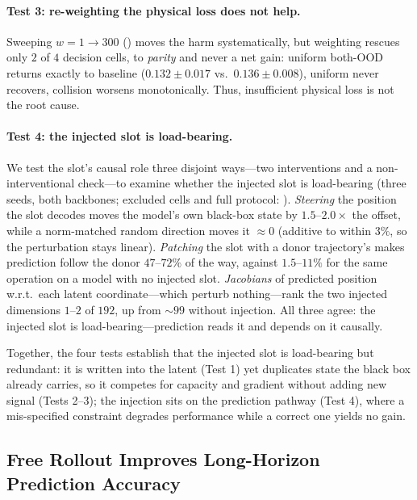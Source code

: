 \paragraph{Test 3: re-weighting the physical loss does not help.}
Sweeping $w{=}1\!\to\!300$ () moves the harm systematically, but weighting rescues only $2$ of $4$ decision cells, to \emph{parity} and never a net gain: uniform both-OOD returns exactly to baseline ($0.132{\pm}0.017$ vs.\ $0.136{\pm}0.008$), uniform \rmood{} never recovers, collision worsens monotonically. Thus, insufficient physical loss is not the root cause.

\paragraph{Test 4: the injected slot is load-bearing.}
We test the slot's causal role three disjoint ways---two interventions and a non-interventional check---to examine whether the injected slot is load-bearing (three seeds, both backbones; excluded cells and full protocol: ). \emph{Steering} the position the slot decodes moves the model's own black-box state by $1.5$--$2.0\times$ the offset, while a norm-matched random direction moves it ${\approx}0$ (additive to within $3\%$, so the perturbation stays linear). \emph{Patching} the slot with a donor trajectory's makes prediction follow the donor $47$--$72\%$ of the way, against $1.5$--$11\%$ for the same operation on a model with no injected slot. \emph{Jacobians} of predicted position w.r.t.\ each latent coordinate---which perturb nothing---rank the two injected dimensions $1$--$2$ of $192$, up from ${\sim}99$ without injection. All three agree: the injected slot is load-bearing---prediction reads it and depends on it causally.

Together, the four tests establish that the injected slot is load-bearing but redundant: it is written into the latent (Test 1) yet duplicates state the black box already carries, so it competes for capacity and gradient without adding new signal (Tests 2–3); the injection sits on the prediction pathway (Test 4), where a mis-specified constraint degrades performance while a correct one yields no gain.

\subsection{Free Rollout Improves Long-Horizon Prediction Accuracy}
\label{sec:fr}

